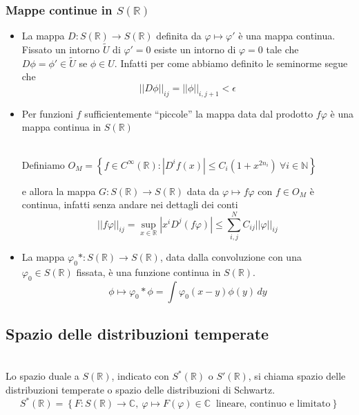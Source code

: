 \documentclass[11pt,a4paper,twoside]{book}
\newenvironment{definizione}[1][\empty]{\begin{Definizione}{
\ifx\empty#1\relax\else\mdseries\itshape#1\\\fi
}{}}{\end{Definizione}}
\theoremstyle{esss}
\theoremstyle{dotless}
\numberwithin{equation}{section} %
\begin{document}
\subsubsection{Mappe continue in \boldmath$S(\mathbb{R})$}
\begin{itemize}
\item La mappa $D:S(\mathbb{R})\rightarrow S(\mathbb{R})$ definita da $\varphi\mapsto\varphi'$ è una mappa continua. Fissato un intorno $\tilde{U}$ di $\varphi'=0$ esiste un intorno di $\varphi=0$ tale che $D\phi=\phi'\in\tilde{U}$ se $\phi\in U$. Infatti per come abbiamo definito le seminorme segue che 
\[
\left|\left| D\phi\right|\right|_{ij}=||\phi||_{i,j+1}<\epsilon
\] 

\item Per funzioni $f$ sufficientemente ``piccole'' la mappa data dal prodotto $f\varphi$ è una mappa continua in $S(\mathbb{R})$
\begin{definizione}Definiamo 
$O_M=\left\{f\in C^\infty(\mathbb{R}) : \left|D^i f(x)\right|\leq C_i(1+x^{2n_i})\>\forall i\in\mathbb{N}\right\}$
\end{definizione}
e allora la mappa $G:S(\mathbb{R})\rightarrow S(\mathbb{R})$ data da $\varphi\mapsto f\varphi$ con $f\in O_M$ è continua, infatti senza andare nei dettagli dei conti
\[
\left|\left|f\varphi\right|\right|_{ij}=\sup_{x\in\mathbb{R}} \left|x^iD^j (f\varphi)\right| \leq  \sum_{i,j}^N C_{ij} ||\varphi||_{ij}
\]
\item La mappa $\varphi_0 * :S(\mathbb{R})\rightarrow S(\mathbb{R})$, data dalla convoluzione con una $\varphi_0\in S(\mathbb{R})$ fissata, è una funzione continua in $S(\mathbb{R})$.
\[
\phi\mapsto \varphi_0 * \phi = \int \varphi_0(x-y) \phi(y)\, dy
\]


\end{itemize}

\subsection{Spazio delle distribuzioni temperate}


\begin{definizione}Lo spazio duale a $S(\mathbb{R})$, indicato con $S^*(\mathbb{R})$ o $S'(\mathbb{R})$, si chiama spazio delle distribuzioni temperate o spazio delle distribuzioni di Schwartz.
\[
S^*(\mathbb{R})=\left\{F :S(\mathbb{R})\rightarrow\mathbb{C}, \> \varphi\mapsto F(\varphi)\in\mathbb{C}  \> \text{ lineare, continuo e limitato}\right\}
\]
\end{definizione}
\end{document}
